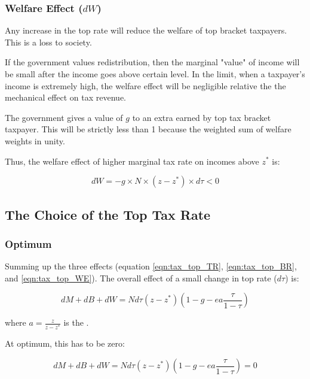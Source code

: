         \subsubsection{Welfare Effect ($dW$)}

            Any increase in the top rate will reduce the welfare of top bracket taxpayers. This is a loss to society.

            If the government values redistribution, then the marginal "value" of income will be small after the income goes above certain level. In the limit, when a taxpayer's income is extremely high, the welfare effect will be negligible relative the the mechanical effect on tax revenue.

            The government gives a value of $g$ to an extra  earned by top tax bracket taxpayer. This will be strictly less than 1 because the weighted sum of welfare weights in unity.

            Thus, the welfare effect of higher marginal tax rate on incomes above $z^*$ is:

            \begin{equation}
                dW = -g \times N \times (z-z^*) \times d\tau < 0
                \label{eqn:tax_top_WE}
            \end{equation}

    \subsection{The Choice of the Top Tax Rate}

        \subsubsection{Optimum}

            Summing up the three effects (equation \ref{eqn:tax_top_TR}, \ref{eqn:tax_top_BR}, and \ref{eqn:tax_top_WE}). The overall effect of a small change in top rate ($d\tau$) is:
    
            \begin{equation*}
                dM + dB + dW = Nd\tau (z-z^*) \left( 1-g-ea \frac{\tau}{1-\tau} \right)
            \end{equation*}
    
            where $a= \frac{z}{z-z^*}$ is the .
    
            At optimum, this has to be zero:
    
            \begin{equation*}
                dM + dB + dW = Nd\tau (z-z^*) \left( 1-g-ea \frac{\tau}{1-\tau} \right) = 0
            \end{equation*}
    
